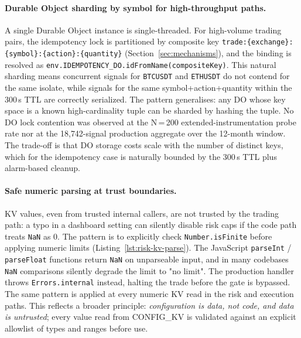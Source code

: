 \paragraph{Durable Object sharding by symbol for high-throughput paths.}
A single Durable Object instance is single-threaded. For high-volume trading pairs, the idempotency lock is partitioned by composite key \texttt{trade:\{exchange\}:\{symbol\}:\{action\}:\{quantity\}} (Section~\ref{sec:mechanisms}), and the binding is resolved as \texttt{env.IDEMPOTENCY\_DO.idFromName(compositeKey)}. This natural sharding means concurrent signals for \texttt{BTCUSDT} and \texttt{ETHUSDT} do not contend for the same isolate, while signals for the same symbol+action+quantity within the 300\,s TTL are correctly serialized. The pattern generalises: any DO whose key space is a known high-cardinality tuple can be sharded by hashing the tuple. No DO lock contention was observed at the N\,=\,200 extended-instrumentation probe rate nor at the 18{,}742-signal production aggregate over the 12-month window. The trade-off is that DO storage costs scale with the number of distinct keys, which for the idempotency case is naturally bounded by the 300\,s TTL plus alarm-based cleanup.

\paragraph{Safe numeric parsing at trust boundaries.}
KV values, even from trusted internal callers, are not trusted by the trading path: a typo in a dashboard setting can silently disable risk caps if the code path treats \texttt{NaN} as 0. The pattern is to explicitly check \texttt{Number.isFinite} before applying numeric limits (Listing~\ref{lst:risk-kv-parse}). The JavaScript \texttt{parseInt} / \texttt{parseFloat} functions return \texttt{NaN} on unparseable input, and in many codebases \texttt{NaN} comparisons silently degrade the limit to "no limit". The production handler throws \texttt{Errors.internal} instead, halting the trade before the gate is bypassed. The same pattern is applied at every numeric KV read in the risk and execution paths. This reflects a broader principle: \emph{configuration is data, not code, and data is untrusted}; every value read from CONFIG\_KV is validated against an explicit allowlist of types and ranges before use.


